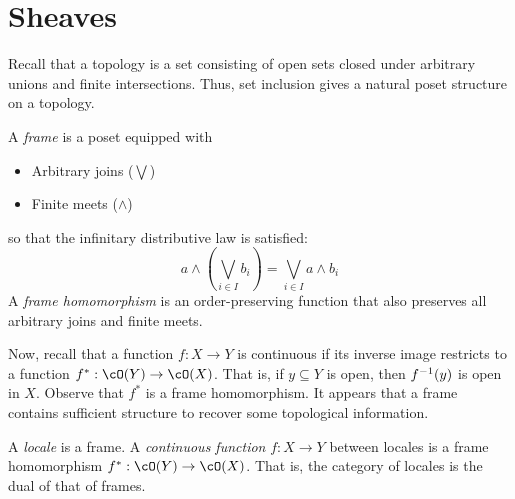 \documentclass[article,10pt,oneside]{memoir}
\begin{document}
\section{Sheaves}
\label{sec:sheaves}

Recall that a topology is a set consisting of open sets closed under arbitrary unions and finite intersections.
Thus, set inclusion gives a natural poset structure on a topology.

\begin{defn}
  A \emph{frame} is a poset equipped with
  \begin{itemize}
  \item Arbitrary joins ($\bigvee$)
  \item Finite meets ($\wedge$)
  \end{itemize}
  so that the infinitary distributive law is satisfied:
  \[
    a \wedge \left(\bigvee_{i \in I}b_{i}\right) = \bigvee_{i \in I}a \wedge b_{i}
  \]
  A \emph{frame homomorphism} is an order-preserving function that also preserves all arbitrary joins and finite meets.
\end{defn}

Now, recall that a function $f : X \to Y$ is continuous if its inverse image restricts to a function $f^{*} : \cO(Y) \to \cO(X)$.
That is, if $y \subseteq Y$ is open, then $f^{-1}(y)$ is open in $X$.
Observe that $f^{*}$ is a frame homomorphism.
It appears that a frame contains sufficient structure to recover some topological information.

\begin{defn}
  A \emph{locale} is a frame.
  A \emph{continuous function} $f : X \to Y$ between locales is a frame homomorphism $f^{*} : \cO(Y) \to \cO(X)$.
  That is, the category of locales is the dual of that of frames.
\end{defn}
\end{document}
